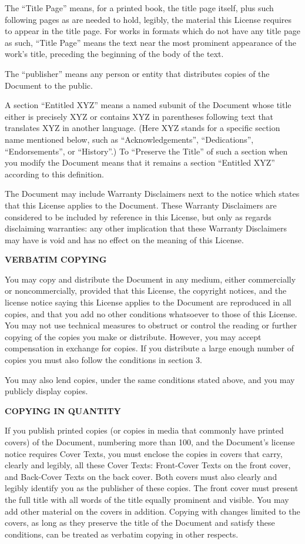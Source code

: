 The ``Title Page'' means, for a printed book, the title page itself, plus such following pages as are needed to hold, legibly, the material this License requires to appear in the title page.  For works in formats which do not have any title page as such, ``Title Page'' means the text near the most prominent appearance of the work's title, preceding the beginning of the body of the text.

The ``publisher'' means any person or entity that distributes copies of the Document to the public.

A section ``Entitled XYZ'' means a named subunit of the Document whose title either is precisely XYZ or contains XYZ in parentheses following text that translates XYZ in another language.  (Here XYZ stands for a specific section name mentioned below, such as ``Acknowledgements'', ``Dedications'', ``Endorsements'', or ``History''.)  To ``Preserve the Title'' of such a section when you modify the Document means that it remains a section ``Entitled XYZ'' according to this definition.

The Document may include Warranty Disclaimers next to the notice which states that this License applies to the Document.  These Warranty Disclaimers are considered to be included by reference in this License, but only as regards disclaiming warranties: any other implication that these Warranty Disclaimers may have is void and has no effect on the meaning of this License.

\item
{\bf VERBATIM COPYING}

You may copy and distribute the Document in any medium, either commercially or noncommercially, provided that this License, the copyright notices, and the license notice saying this License applies to the Document are reproduced in all copies, and that you add no other conditions whatsoever to those of this License.  You may not use technical measures to obstruct or control the reading or further copying of the copies you make or distribute.  However, you may accept compensation in exchange for copies.  If you distribute a large enough number of copies you must also follow the conditions in section 3.

You may also lend copies, under the same conditions stated above, and you may publicly display copies.

\item
{\bf COPYING IN QUANTITY}

If you publish printed copies (or copies in media that commonly have printed covers) of the Document, numbering more than 100, and the Document's license notice requires Cover Texts, you must enclose the copies in covers that carry, clearly and legibly, all these Cover Texts: Front-Cover Texts on the front cover, and Back-Cover Texts on the back cover.  Both covers must also clearly and legibly identify you as the publisher of these copies.  The front cover must present the full title with all words of the title equally prominent and visible.  You may add other material on the covers in addition. Copying with changes limited to the covers, as long as they preserve the title of the Document and satisfy these conditions, can be treated as verbatim copying in other respects.

